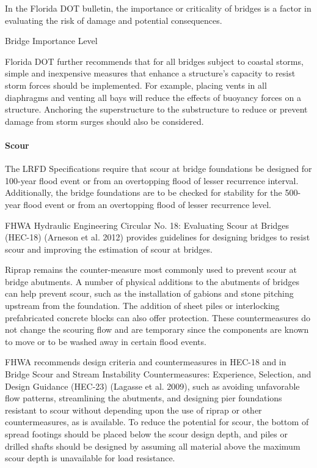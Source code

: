 In the Florida DOT bulletin, the importance or criticality of bridges is a factor in evaluating the risk of damage and potential consequences.

\begin{table}
  \caption{Bridge Importance Level}
  \label{tab:bridge-importance-level}
  
\end{table}

Florida DOT further recommends that for all bridges subject to coastal storms, simple and inexpensive measures that enhance a structure’s capacity to resist storm forces should be implemented. For example, placing vents in all diaphragms and venting all bays will reduce the effects of buoyancy forces on a structure. Anchoring the superstructure to the substructure to reduce or prevent damage from storm surges should also be considered.


\paragraph*{Scour}
The LRFD Specifications require that scour at bridge foundations be designed for 100-year flood event or from
an overtopping flood of lesser recurrence interval. Additionally, the bridge foundations are to be checked for
stability for the 500-year flood event or from an overtopping flood of lesser recurrence level.

FHWA Hydraulic Engineering Circular No. 18: Evaluating Scour at Bridges (HEC-18) (Arneson et al. 2012)
provides guidelines for designing bridges to resist scour and improving the estimation of scour at bridges.

Riprap remains the counter-measure most commonly used to prevent scour at bridge abutments. A number of
physical additions to the abutments of bridges can help prevent scour, such as the installation of gabions and stone
pitching upstream from the foundation. The addition of sheet piles or interlocking prefabricated concrete blocks can also offer protection. These countermeasures do not change the scouring flow and are temporary since the
components are known to move or to be washed away in certain flood events.

FHWA recommends design criteria and countermeasures in HEC-18 and in Bridge Scour and Stream Instability
Countermeasures: Experience, Selection, and Design Guidance (HEC-23) (Lagasse et al. 2009), such as avoiding
unfavorable flow patterns, streamlining the abutments, and designing pier foundations resistant to scour without
depending upon the use of riprap or other countermeasures, as is available. To reduce the potential for scour, the
bottom of spread footings should be placed below the scour design depth, and piles or drilled shafts should be
designed by assuming all material above the maximum scour depth is unavailable for load resistance.

